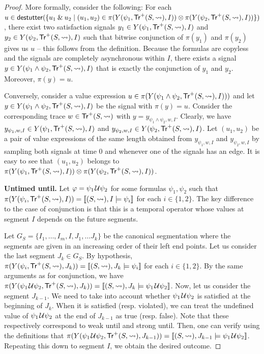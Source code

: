 \begin{proof}
	More formally, consider the following:
	For each $u \in \destutter(\{ u_1 \BitAnd u_2 \st (u_1,u_2) \in \pi(Y(\psi_1, \tr^+(S,{\hb}), I)) \otimes \pi(Y(\psi_2, \tr^+(S,{\hb}), I))\})$, there exist two satisfaction signals $y_1 \in Y(\psi_1, \mathsf{Tr}^+(S,{\rightsquigarrow}), I)$ and $y_2 \in Y(\psi_2, \mathsf{Tr}^+(S,{\rightsquigarrow}), I)$ such that bitwise conjunction of $\pi(y_1)$ and $\pi(y_2)$ gives us $u$ -- this follows from the definition.
	Because the formulas are copyless and the signals are completely asynchronous within $I$, there exists a signal $y \in Y(\psi_1 \land \psi_2, \mathsf{Tr}^+(S,{\rightsquigarrow}), I)$ that is exactly the conjunction of $y_1$ and $y_2$.
	Moreover, $\pi(y) = u$.
	
	Conversely, consider a value expression $u \in \pi(Y(\psi_1 \land \psi_2, \mathsf{Tr}^+(S,{\rightsquigarrow}), I)))$ and let $y \in Y(\psi_1 \land \psi_2, \mathsf{Tr}^+(S,{\rightsquigarrow}), I)$ be the signal with $\pi(y) = u$.
	Consider the corresponding trace $w \in \mathsf{Tr}^+(S,{\rightsquigarrow})$ with $y = y_{\psi_1 \land \psi_2, w, I}$.
	Clearly, we have $y_{\psi_1, w, I} \in Y(\psi_1, \mathsf{Tr}^+(S,{\rightsquigarrow}), I)$ and $y_{\psi_2, w, I} \in Y(\psi_2, \mathsf{Tr}^+(S,{\rightsquigarrow}), I)$.
	Let $(u_1,u_2)$ be a pair of value expressions of the same length obtained from $y_{\psi_1, w, I}$ and $y_{\psi_2, w, I}$ by sampling both signals at time 0 and whenever one of the signals has an edge.
	It is easy to see that $(u_1,u_2)$ belongs to $\pi(Y(\psi_1, \mathsf{Tr}^+(S,{\rightsquigarrow}), I)) \otimes \pi(Y(\psi_2, \mathsf{Tr}^+(S,{\rightsquigarrow}), I))$.
	
	\noindent\textbf{Untimed until.}
	Let $\varphi = \psi_1 \kern.1em\mathcal{U} \psi_2$ for some formulas $\psi_1, \psi_2$ such that $\pi(Y(\psi_i, \mathsf{Tr}^+(S,{\rightsquigarrow}), I)) = \llbracket (S,{\rightsquigarrow}), I \models \psi_i \rrbracket$ for each $i \in \{1,2\}$.
	The key difference to the case of conjunction is that this is a temporal operator whose values at segment $I$ depends on the future segments.
	
	Let $G_S = \{ I_1, \ldots, I_m, I, J_1, \ldots J_k \}$ be the canonical segmentation where the segments are given in an increasing order of their left end points.
	Let us consider the last segment $J_k \in G_S$.
	By hypothesis, $\pi(Y(\psi_i, \mathsf{Tr}^+(S,{\rightsquigarrow}), J_k)) = \llbracket (S,{\rightsquigarrow}), J_k \models \psi_i \rrbracket$ for each $i \in \{1,2\}$.
	By the same arguments as for conjunction, we have $\pi(Y(\psi_1 \kern.1em\mathcal{U} \psi_2, \mathsf{Tr}^+(S,{\rightsquigarrow}), J_k)) = \llbracket (S,{\rightsquigarrow}), J_k \models \psi_1 \kern.1em\mathcal{U} \psi_2 \rrbracket$.
	Now, let us consider the segment $J_{k-1}$.
	We need to take into account whether $\psi_1 \kern.1em\mathcal{U} \psi_2$ is satisfied at the beginning of $J_k$.
	When it is satisfied (resp. violated), we can treat the undefined value of $\psi_1 \kern.1em\mathcal{U} \psi_2$ at the end of $J_{k-1}$ as true (resp. false).
	Note that these respectively correspond to weak until and strong until.
	Then, one can verify using the definitions that $\pi(Y(\psi_1 \kern.1em\mathcal{U} \psi_2, \mathsf{Tr}^+(S,{\rightsquigarrow}), J_{k-1})) = \llbracket (S,{\rightsquigarrow}), J_{k-1} \models \psi_1 \kern.1em\mathcal{U} \psi_2 \rrbracket$.
	Repeating this down to segment $I$, we obtain the desired outcome.
	

\end{proof}
